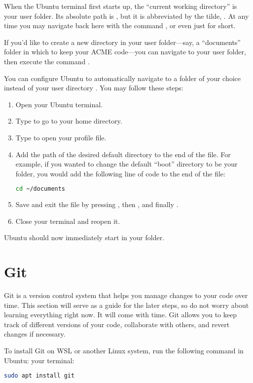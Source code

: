 When the Ubuntu terminal first starts up, the ``current working directory'' is your user folder.
Its absolute path is , but it is abbreviated by the tilde, \li{\~}.
At any time you may navigate back here with the command , or even just  for short.

If you'd like to create a new directory in your user folder---say, a ``documents'' folder in which to keep your ACME code---you can navigate to your user folder, then execute the command .

You can configure Ubuntu to automatically navigate to a folder of your choice instead of your user directory \li{\~}.
You may follow these steps:
\begin{enumerate}
    \item Open your Ubuntu terminal.
    \item Type  to go to your home directory.
    \item Type  to open your profile file.
    \item Add the path of the desired default directory to the end of the file.
    For example, if you wanted to change the default ``boot'' directory to be your  folder, you would add the following line of code to the end of the file:
    \begin{lstlisting}[language=bash]
cd ~/documents
    \end{lstlisting}
    \item Save and exit the file by pressing , then , and finally .
    \item Close your terminal and reopen it.
\end{enumerate}
Ubuntu should now immediately start in your  folder.
\fi


\ifbootcamp
\section*{Git}

Git is a version control system that helps you manage changes to your code over time. 
This section will serve as a guide for the later steps, so do not worry about learning everything right now. 
It will come with time.
Git allows you to keep track of different versions of your code, collaborate with others, and revert changes if necessary.

To install Git on WSL or another Linux system, run the following command in 
\ifwindows
Ubuntu:
\else
your terminal:
\fi
\begin{lstlisting}[language=bash]
sudo apt install git
\end{lstlisting}
\ifwindows

